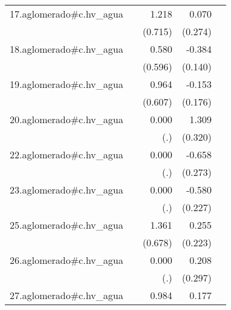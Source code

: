 {\begin{longtable}{l*{4}{D{.}{.}{-1}}}
\addlinespace
17.aglomerado#c.hv\_agua&                     &       1.218         &       0.070         &                     \\
            &                     &     (0.715)         &     (0.274)         &                     \\
\addlinespace
18.aglomerado#c.hv\_agua&                     &       0.580         &      -0.384\sym{**} &                     \\
            &                     &     (0.596)         &     (0.140)         &                     \\
\addlinespace
19.aglomerado#c.hv\_agua&                     &       0.964         &      -0.153         &                     \\
            &                     &     (0.607)         &     (0.176)         &                     \\
\addlinespace
20.aglomerado#c.hv\_agua&                     &       0.000         &       1.309\sym{***}&                     \\
            &                     &         (.)         &     (0.320)         &                     \\
\addlinespace
22.aglomerado#c.hv\_agua&                     &       0.000         &      -0.658\sym{*}  &                     \\
            &                     &         (.)         &     (0.273)         &                     \\
\addlinespace
23.aglomerado#c.hv\_agua&                     &       0.000         &      -0.580\sym{*}  &                     \\
            &                     &         (.)         &     (0.227)         &                     \\
\addlinespace
25.aglomerado#c.hv\_agua&                     &       1.361\sym{*}  &       0.255         &                     \\
            &                     &     (0.678)         &     (0.223)         &                     \\
\addlinespace
26.aglomerado#c.hv\_agua&                     &       0.000         &       0.208         &                     \\
            &                     &         (.)         &     (0.297)         &                     \\
\addlinespace
27.aglomerado#c.hv\_agua&                     &       0.984         &       0.177         &                     \\

\end{longtable}}
